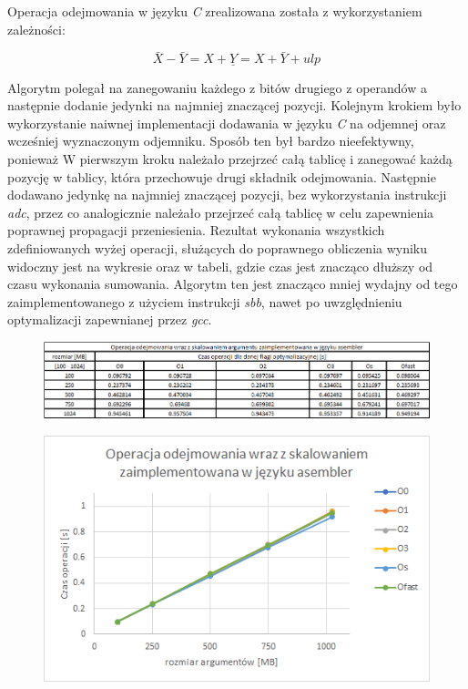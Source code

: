 \documentclass{article}
\begin{document}
\vspace{5mm}

Operacja odejmowania w języku \textit{C} zrealizowana została z wykorzystaniem zależności:

\begin{equation}
\bar{X} - \bar{Y} = X + \underline{Y} = X + \bar{Y} + ulp
\end{equation}

Algorytm polegał na zanegowaniu każdego z bitów drugiego z operandów a następnie dodanie jedynki na najmniej znaczącej pozycji. Kolejnym krokiem było wykorzystanie naiwnej implementacji dodawania w języku \textit{C} na odjemnej oraz wcześniej wyznaczonym odjemniku. Sposób ten był bardzo nieefektywny, ponieważ W pierwszym kroku należało przejrzeć całą tablicę i zanegować każdą pozycję w tablicy, która przechowuje drugi składnik odejmowania. Następnie dodawano jedynkę na najmniej znaczącej pozycji, bez wykorzystania instrukcji \textit{adc}, przez co analogicznie należało przejrzeć całą tablicę w celu zapewnienia poprawnej propagacji przeniesienia. Rezultat wykonania wszystkich zdefiniowanych wyżej operacji, służących do poprawnego obliczenia wyniku widoczny jest na wykresie oraz w tabeli, gdzie czas jest znacząco dłuższy od czasu wykonania sumowania. Algorytm ten jest znacząco mniej wydajny od tego zaimplementowanego z użyciem instrukcji \textit{sbb}, nawet po uwzględnieniu optymalizacji zapewnianej przez \textit{gcc}.

\newpage{}

\begin{figure}[h!]

\includegraphics[scale=0.65]{charts/sbb_scale_asm.png}

\end{figure}

\begin{figure}[h!]
\centering
\includegraphics[scale=0.75]{charts/sbb_scale_asm_p.png}

\end{figure}
\end{document}
